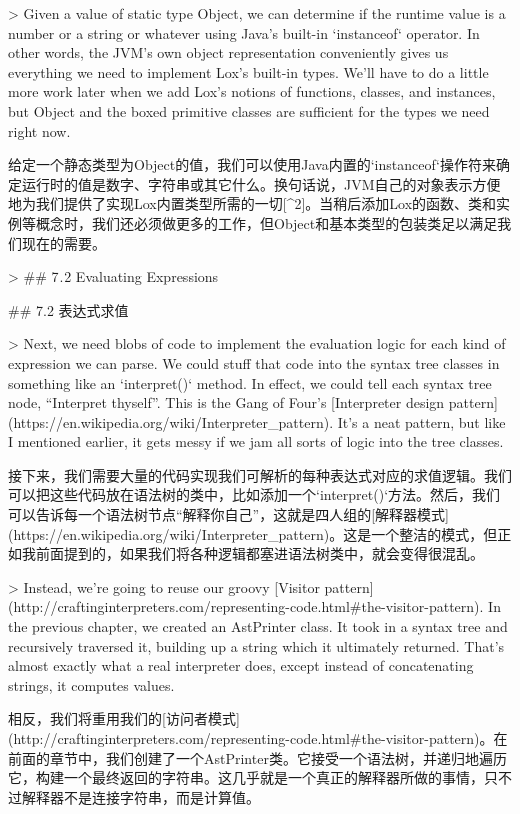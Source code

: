 \documentclass[cn,11pt,chinese]{elegantbook}
\begin{document}
> Given a value of static type Object, we can determine if the runtime value is a number or a string or whatever using Java’s built-in `instanceof` operator. In other words, the JVM’s own object representation conveniently gives us everything we need to implement Lox’s built-in types. We’ll have to do a little more work later when we add Lox’s notions of functions, classes, and instances, but Object and the boxed primitive classes are sufficient for the types we need right now.

给定一个静态类型为Object的值，我们可以使用Java内置的`instanceof`操作符来确定运行时的值是数字、字符串或其它什么。换句话说，JVM自己的对象表示方便地为我们提供了实现Lox内置类型所需的一切[^2]。当稍后添加Lox的函数、类和实例等概念时，我们还必须做更多的工作，但Object和基本类型的包装类足以满足我们现在的需要。

> ## 7 . 2 Evaluating Expressions

## 7.2 表达式求值

> Next, we need blobs of code to implement the evaluation logic for each kind of expression we can parse. We could stuff that code into the syntax tree classes in something like an `interpret()` method. In effect, we could tell each syntax tree node, “Interpret thyself”. This is the Gang of Four’s [Interpreter design pattern](https://en.wikipedia.org/wiki/Interpreter_pattern). It’s a neat pattern, but like I mentioned earlier, it gets messy if we jam all sorts of logic into the tree classes.

接下来，我们需要大量的代码实现我们可解析的每种表达式对应的求值逻辑。我们可以把这些代码放在语法树的类中，比如添加一个`interpret()`方法。然后，我们可以告诉每一个语法树节点“解释你自己”，这就是四人组的[解释器模式](https://en.wikipedia.org/wiki/Interpreter_pattern)。这是一个整洁的模式，但正如我前面提到的，如果我们将各种逻辑都塞进语法树类中，就会变得很混乱。

> Instead, we’re going to reuse our groovy [Visitor pattern](http://craftinginterpreters.com/representing-code.html#the-visitor-pattern). In the previous chapter, we created an AstPrinter class. It took in a syntax tree and recursively traversed it, building up a string which it ultimately returned. That’s almost exactly what a real interpreter does, except instead of concatenating strings, it computes values.

相反，我们将重用我们的[访问者模式](http://craftinginterpreters.com/representing-code.html#the-visitor-pattern)。在前面的章节中，我们创建了一个AstPrinter类。它接受一个语法树，并递归地遍历它，构建一个最终返回的字符串。这几乎就是一个真正的解释器所做的事情，只不过解释器不是连接字符串，而是计算值。
\end{document}
